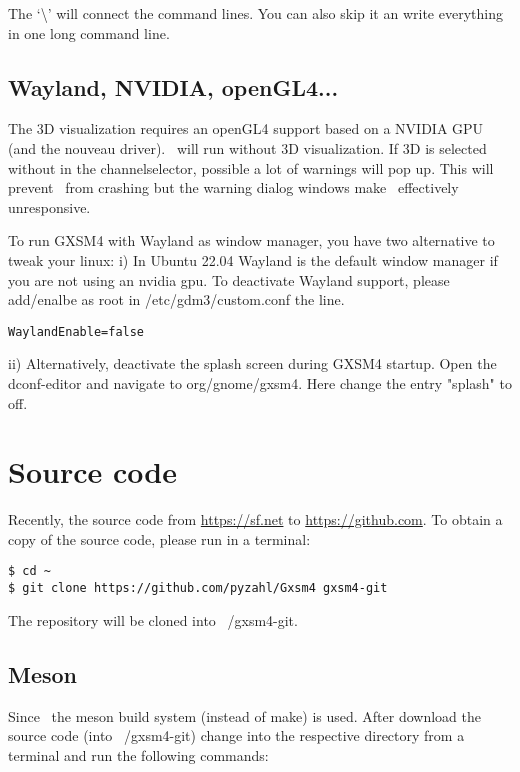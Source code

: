 The `\textbackslash' will connect the command lines. You can also skip it an write everything in one long command line.
 
\subsection{Wayland, NVIDIA, openGL4...}

The 3D visualization requires an openGL4 support based on a NVIDIA GPU (and the nouveau driver). \Gxsm\ will run without 3D visualization. If 3D is selected without in the channelselector, possible a lot of warnings will pop up. This will prevent \Gxsm\ from crashing but the warning dialog windows make \Gxsm\ effectively unresponsive.

To run GXSM4 with Wayland as window manager, you have two alternative to tweak your linux: i) In Ubuntu 22.04 Wayland is the default window manager if you are not using an nvidia gpu. To deactivate Wayland support, please add/enalbe as root in /etc/gdm3/custom.conf the line.

\begin{verbatim}
WaylandEnable=false
\end{verbatim}

ii) Alternatively, deactivate the splash screen during GXSM4 startup. Open the dconf-editor and navigate to org/gnome/gxsm4. Here change the entry "splash" to off.

\section{Source code}

Recently, the source code from \url{https://sf.net} to \url{https://github.com}. To obtain a copy of the source code, please run in a terminal:

\begin{verbatim}
$ cd ~
$ git clone https://github.com/pyzahl/Gxsm4 gxsm4-git
\end{verbatim}

The repository will be cloned into ~/gxsm4-git.

\subsection{Meson}
Since \Gxsm\ the meson build system (instead of make) is used. After download the source code (into ~/gxsm4-git) change into the respective directory from a terminal and run the following commands:

